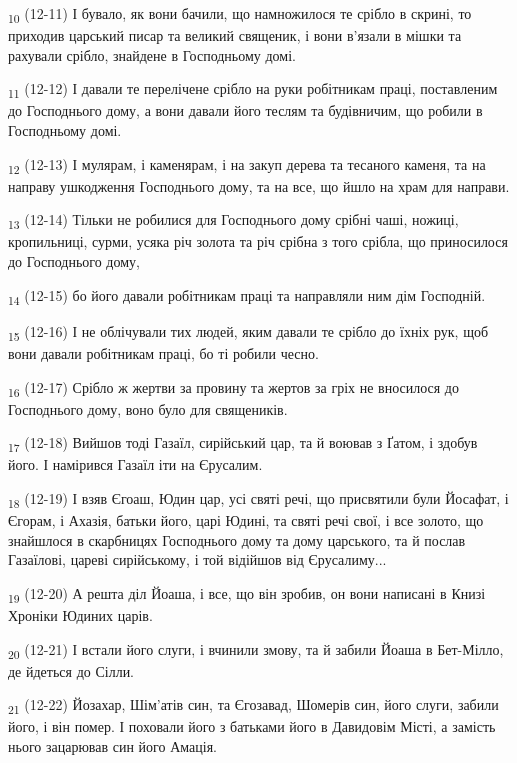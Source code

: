 \begin{tcolorbox}
\textsubscript{10} (12-11) І бувало, як вони бачили, що намножилося те срібло в скрині, то приходив царський писар та великий священик, і вони в'язали в мішки та рахували срібло, знайдене в Господньому домі.
\end{tcolorbox}
\begin{tcolorbox}
\textsubscript{11} (12-12) І давали те перелічене срібло на руки робітникам праці, поставленим до Господнього дому, а вони давали його теслям та будівничим, що робили в Господньому домі.
\end{tcolorbox}
\begin{tcolorbox}
\textsubscript{12} (12-13) І мулярам, і каменярам, і на закуп дерева та тесаного каменя, та на направу ушкодження Господнього дому, та на все, що йшло на храм для направи.
\end{tcolorbox}
\begin{tcolorbox}
\textsubscript{13} (12-14) Тільки не робилися для Господнього дому срібні чаші, ножиці, кропильниці, сурми, усяка річ золота та річ срібна з того срібла, що приносилося до Господнього дому,
\end{tcolorbox}
\begin{tcolorbox}
\textsubscript{14} (12-15) бо його давали робітникам праці та направляли ним дім Господній.
\end{tcolorbox}
\begin{tcolorbox}
\textsubscript{15} (12-16) І не облічували тих людей, яким давали те срібло до їхніх рук, щоб вони давали робітникам праці, бо ті робили чесно.
\end{tcolorbox}
\begin{tcolorbox}
\textsubscript{16} (12-17) Срібло ж жертви за провину та жертов за гріх не вносилося до Господнього дому, воно було для священиків.
\end{tcolorbox}
\begin{tcolorbox}
\textsubscript{17} (12-18) Вийшов тоді Газаїл, сирійський цар, та й воював з Ґатом, і здобув його. І намірився Газаїл іти на Єрусалим.
\end{tcolorbox}
\begin{tcolorbox}
\textsubscript{18} (12-19) І взяв Єгоаш, Юдин цар, усі святі речі, що присвятили були Йосафат, і Єгорам, і Ахазія, батьки його, царі Юдині, та святі речі свої, і все золото, що знайшлося в скарбницях Господнього дому та дому царського, та й послав Газаїлові, цареві сирійському, і той відійшов від Єрусалиму...
\end{tcolorbox}
\begin{tcolorbox}
\textsubscript{19} (12-20) А решта діл Йоаша, і все, що він зробив, он вони написані в Книзі Хроніки Юдиних царів.
\end{tcolorbox}
\begin{tcolorbox}
\textsubscript{20} (12-21) І встали його слуги, і вчинили змову, та й забили Йоаша в Бет-Мілло, де йдеться до Сілли.
\end{tcolorbox}
\begin{tcolorbox}
\textsubscript{21} (12-22) Йозахар, Шім'атів син, та Єгозавад, Шомерів син, його слуги, забили його, і він помер. І поховали його з батьками його в Давидовім Місті, а замість нього зацарював син його Амація.
\end{tcolorbox}
